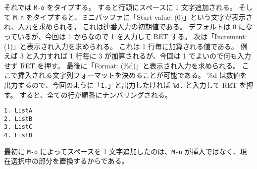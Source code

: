 それでは \texttt{M-o} をタイプする。
すると行頭にスペースに 1 文字追加される。
そして \texttt{M-n} をタイプすると、ミニバッファに「Start value: (0)」という文字が表示され、入力を求められる。
これは連番入力の初期値である。
デフォルトは 0 になっているが、今回は 1 からなので 1 を入力して RET する。
次は「Increment: (1)」と表示され入力を求められる。
これは 1 行毎に加算される値である。
例えば 3 と入力すれば 1 行毎に 3 が加算されるが、今回は 1 でよいので何も入力せず RET を押す。
最後に「Format: (\%d)」と表示され入力を求められる。
ここで挿入される文字列フォーマットを決めることが可能である。
\%d は数値を出力するので、今回のように「\texttt{1.}」と出力したければ \texttt{\%d.} と入力して RET を押す。
すると、全ての行が順番にナンバリングされる。
\begin{mdframed}[roundcorner=0.50zw,leftmargin=3.00zw,rightmargin=3.00zw,skipabove=0.40zw,skipbelow=0.40zw,innertopmargin=4.00pt,innerbottommargin=4.00pt,innerleftmargin=5.00pt,innerrightmargin=5.00pt,linecolor=gray!020,linewidth=0.50pt,backgroundcolor=gray!20]
\begin{verbatim}
1. ListA
2. ListB
3. ListC
4. ListD
\end{verbatim}
\end{mdframed}
最初に \texttt{M-o} によってスペースを 1 文字追加したのは、\texttt{M-n} が挿入ではなく、現在選択中の部分を置換するからである。
